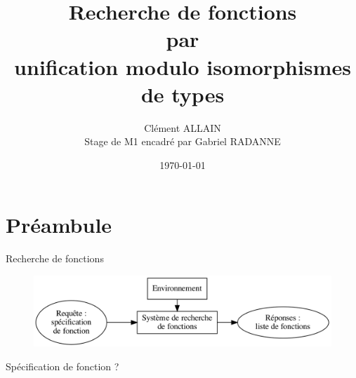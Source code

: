 \documentclass[serif]{beamer}
\title{Recherche de fonctions \\ par \\ unification modulo isomorphismes de types}
\author{Clément ALLAIN \\ Stage de M1 encadré par Gabriel RADANNE}
\date{\today}
\begin{document}

\begin{frame}
 	\titlepage
\end{frame}


\begin{frame}
 	\tableofcontents
\end{frame}


\section{Préambule}


\begin{frame}{Recherche de fonctions}
\begin{figure}[h]
 	\centering
 	\includegraphics[scale=0.2]{graphs/recherche_fonction}
\end{figure}
\centering
Spécification de fonction ?
\end{frame}

\end{document}
